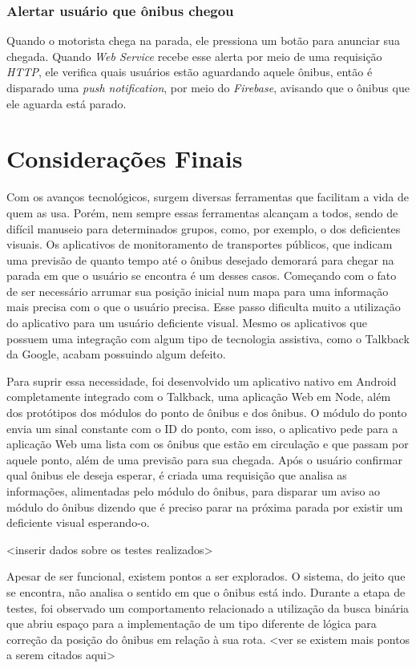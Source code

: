 \documentclass[
	12pt,				%
	oneside,			%
	a4paper,			%
	brazil				%
]{abntex2}
\begin{document}
{\subsection{Alertar usuário que ônibus chegou}

Quando o motorista chega na parada, ele pressiona um botão para anunciar sua chegada. Quando \textit{Web Service} recebe esse alerta por meio de uma requisição \textit{HTTP}, ele verifica quais usuários estão aguardando aquele ônibus, então é disparado uma \textit{push notification}, por meio do \textit{Firebase}, avisando que o ônibus que ele aguarda está parado.

\chapter{Considerações Finais}

Com os avanços tecnológicos, surgem diversas ferramentas que facilitam a vida de quem as usa. Porém, nem sempre essas ferramentas alcançam a todos, sendo de difícil manuseio para determinados grupos, como, por exemplo, o dos deficientes visuais. Os aplicativos de monitoramento de transportes públicos, que indicam uma previsão de quanto tempo até o ônibus desejado demorará para chegar na parada em que o usuário se encontra é um desses casos. Começando com o fato de ser necessário arrumar sua posição inicial num mapa para uma informação mais precisa com o que o usuário precisa. Esse passo dificulta muito a utilização do aplicativo para um usuário deficiente visual. Mesmo os aplicativos que possuem uma integração com algum tipo de tecnologia assistiva, como o Talkback da Google, acabam possuindo algum defeito.

Para suprir essa necessidade, foi desenvolvido um aplicativo nativo em Android completamente integrado com o Talkback, uma aplicação Web em Node, além dos protótipos dos módulos do ponto de ônibus e dos ônibus. O módulo do ponto envia um sinal constante com o ID do ponto, com isso, o aplicativo pede para a aplicação Web uma lista com os ônibus que estão em circulação e que passam por aquele ponto, além de uma previsão para sua chegada. Após o usuário confirmar qual ônibus ele deseja esperar, é criada uma requisição que analisa as informações, alimentadas pelo módulo do ônibus, para disparar um aviso ao módulo do ônibus dizendo que é preciso parar na próxima parada por existir um deficiente visual esperando-o.

<inserir dados sobre os testes realizados>

Apesar de ser funcional, existem pontos a ser explorados. O sistema, do jeito que se encontra, não analisa o sentido em que o ônibus está indo. Durante a etapa de testes, foi observado um comportamento relacionado a utilização da busca binária que abriu espaço para a implementação de um tipo diferente de lógica para correção da posição do ônibus em relação à sua rota. <ver se existem mais pontos a serem citados aqui>

}
\end{document}
